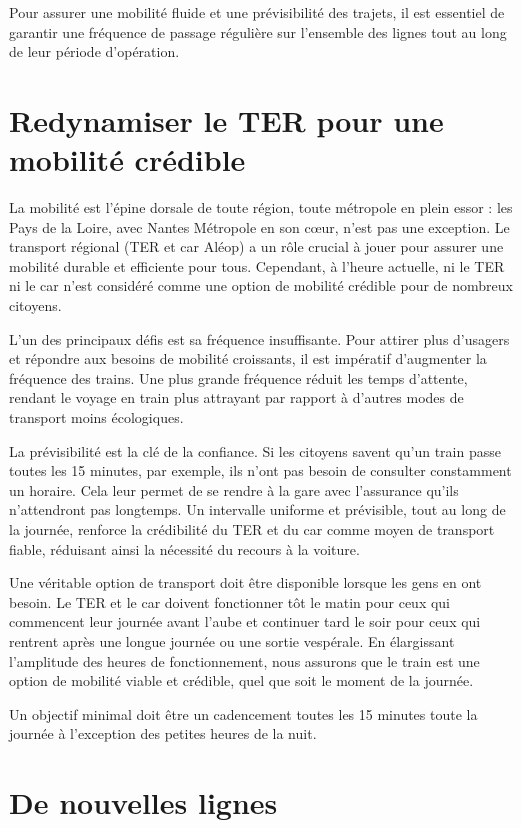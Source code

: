 Pour assurer une mobilité fluide et une prévisibilité des trajets, il
est essentiel de garantir une fréquence de passage régulière sur
l'ensemble des lignes tout au long de leur période d'opération.


\section{Redynamiser le TER pour une mobilité crédible}

La mobilité est l'épine dorsale de toute région, toute métropole en
plein essor : les Pays de la Loire, avec Nantes Métropole en son cœur,
n'est pas une exception. Le transport régional (TER et car Aléop) a un
rôle crucial à jouer pour assurer une mobilité durable et efficiente
pour tous. Cependant, à l'heure actuelle, ni le TER ni le car n'est
considéré comme une option de mobilité crédible pour de nombreux
citoyens.

L'un des principaux défis est sa fréquence insuffisante. Pour attirer
plus d'usagers et répondre aux besoins de mobilité croissants, il est
impératif d'augmenter la fréquence des trains. Une plus grande
fréquence réduit les temps d'attente, rendant le voyage en train plus
attrayant par rapport à d'autres modes de transport moins écologiques.

La prévisibilité est la clé de la confiance. Si les citoyens savent
qu'un train passe toutes les 15 minutes, par exemple, ils n'ont pas
besoin de consulter constamment un horaire. Cela leur permet de se
rendre à la gare avec l'assurance qu'ils n'attendront pas
longtemps. Un intervalle uniforme et prévisible, tout au long de la
journée, renforce la crédibilité du TER et du car comme moyen de
transport fiable, réduisant ainsi la nécessité du recours à la
voiture.

Une véritable option de transport doit être disponible lorsque les
gens en ont besoin. Le TER et le car doivent fonctionner tôt le matin
pour ceux qui commencent leur journée avant l'aube et continuer tard
le soir pour ceux qui rentrent après une longue journée ou une sortie
vespérale. En élargissant l'amplitude des heures de fonctionnement,
nous assurons que le train est une option de mobilité viable et
crédible, quel que soit le moment de la journée.

Un objectif minimal doit être un cadencement toutes les 15 minutes
toute la journée à l'exception des petites heures de la nuit.


\section{De nouvelles lignes}


